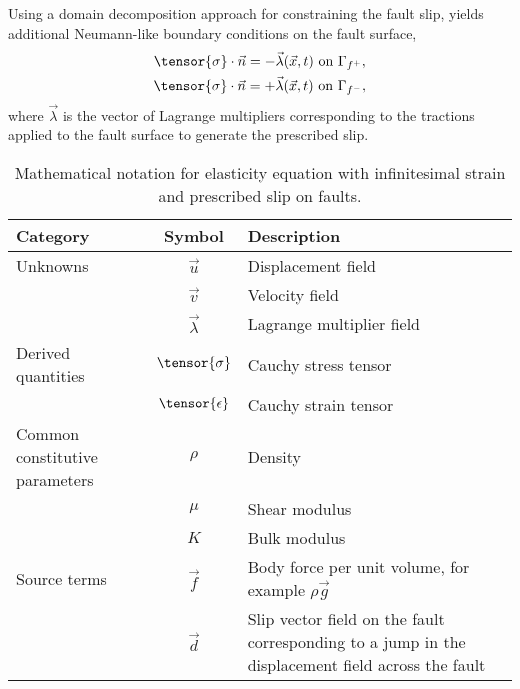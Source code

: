 Using a domain decomposition approach for constraining the fault slip,
yields additional Neumann-like boundary conditions on the fault
surface,
\begin{gather}
  \tensor{\sigma} \cdot \vec{n} = -\vec{\lambda}(\vec{x},t) \text{ on }\Gamma_{f^+}, \\
  \tensor{\sigma} \cdot \vec{n} = +\vec{\lambda}(\vec{x},t) \text{ on }\Gamma_{f^-},
\end{gather}
where $\vec{\lambda}$ is the vector of Lagrange multipliers
corresponding to the tractions applied to the fault surface to
generate the prescribed slip. 


\begin{table}[htbp]
  \caption{Mathematical notation for elasticity equation with
    infinitesimal strain and prescribed slip on faults.}
  \label{tab:notation:elasticity:prescribed:slip}
  \begin{tabular}{lcp{3in}}
    \toprule
    {\bf Category} & {\bf Symbol} & {\bf Description} \\
    \midrule
    Unknowns & $\vec{u}$ & Displacement field \\
    & $\vec{v}$ & Velocity field \\
    & $\vec{\lambda}$ & Lagrange multiplier field \\
    Derived quantities & $\tensor{\sigma}$ & Cauchy stress tensor \\
                   & $\tensor{\epsilon}$ & Cauchy strain tensor \\
    Common constitutive parameters & $\rho$ & Density \\
  & $\mu$ & Shear modulus \\
  & $K$ & Bulk modulus \\
Source terms & $\vec{f}$ & Body force per unit volume, for example $\rho \vec{g}$ \\
    & $\vec{d}$ & Slip vector field on the fault corresponding to a
      jump in the displacement field across the fault \\
    \bottomrule
  \end{tabular}
\end{table}


